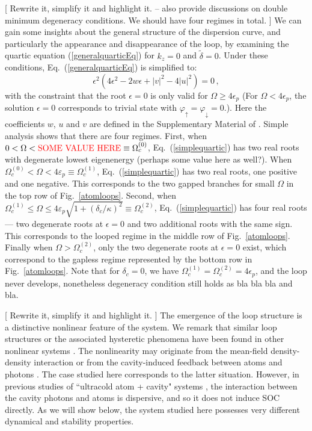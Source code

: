 \documentclass[journal,article,accept,moreauthors,pdftex,12pt,a4paper]{mdpi}
\begin{document}
[{\color{red} Rewrite it, simplify it and highlight it. -- also provide discussions on double minimum degeneracy conditions. We should have four regimes in total. }]  We can gain some insights about the general structure of the dispersion curve, and particularly the appearance and disappearance of the loop, by examining the quartic equation (\ref{generalquarticEq}) for $k_z=0$ and $\tilde{\delta}=0$. Under these conditions, Eq.~(\ref{generalquarticEq}) is simplified to:
\begin{equation}
\epsilon^2(4\epsilon^2-2w\epsilon+|v|^2-4|u|^2)=0\,,
\label{simplequartic}
\end{equation}
with the constraint that the root $\epsilon=0$ is only valid for $\Omega \ge 4\epsilon_p$ (For $\Omega<4\epsilon_p$, the solution $\epsilon=0$ corresponds to trivial state with $\varphi_\uparrow=\varphi_\downarrow=0$.).
Here the coefficients $w$, $u$ and $v$ are defined in the Supplementary Material of \cite{cavitySOC}. Simple analysis shows that there are four regimes. First, when $0<\Omega< \text{\color{red} SOME VALUE HERE} \equiv \Omega_c^{(0)}$, Eq.~(\ref{simplequartic}) has two real roots with degenerate lowest eigenenergy {\color{red} (perhaps some value here as well?)}. When $\Omega_c^{(0)} < \Omega <4\varepsilon_p\equiv\Omega_c^{(1)}$, Eq.~(\ref{simplequartic}) has two real roots, one positive and one negative. This corresponds to the two gapped branches for small $\Omega$ in the top row of Fig.~\ref{atomloops}. Second, when $\Omega_c^{(1)} \leq \Omega \leq  4\varepsilon_p \sqrt{1+(\delta_c/\kappa)^2}\equiv\Omega_c^{(2)}$, Eq.~(\ref{simplequartic}) has four real roots --- two degenerate roots at $\epsilon=0$ and two additional roots with the same sign. This corresponds to the looped regime in the middle row of Fig.~\ref{atomloops}. Finally when $\Omega > \Omega_c^{(2)}$, only the two degenerate roots at $\epsilon=0$ exist, which correspond to the gapless regime represented by the bottom row in Fig.~\ref{atomloops}. Note that for $\delta_c=0$, we have $\Omega_c^{(1)}=\Omega_c^{(2)}=4\epsilon_p$, and the loop never develops, nonetheless degeneracy condition still holds as {\color{red} bla bla bla and bla}. 

[{\color{red} Rewrite it, simplify it and highlight it. }] The emergence of the loop structure is a distinctive nonlinear feature of the system. We remark that similar loop structures or the associated hysteretic phenomena have been found in other nonlinear systems \cite{sup}. The nonlinearity may originate from the mean-field density-density interaction \cite{loopPapers} or from the cavity-induced feedback between atoms and photons \cite{loop1}. The case studied here corresponds to the latter situation. However, in previous studies of ``ultracold atom + cavity" systems \cite{loop1}, the interaction between the cavity photons and atoms is dispersive, and so it does not induce SOC directly. As we will show below, the system studied here possesses very different dynamical and stability properties.   
\end{document}
